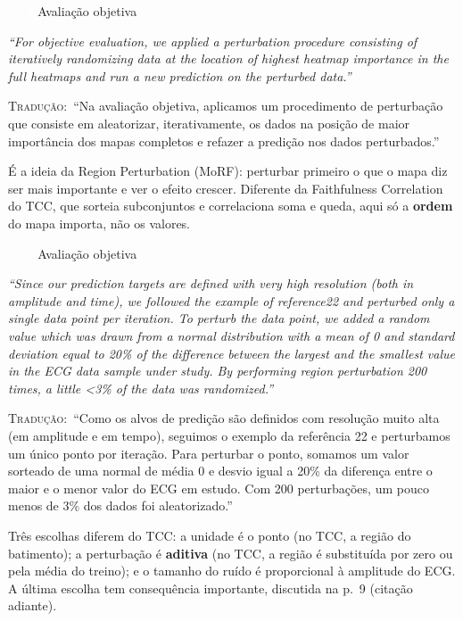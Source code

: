 \documentclass[11pt,a4paper]{article}
\newcommand{\pagechip}[1]{{\setlength{\fboxsep}{1.5pt}\colorbox{cAcc}{\textcolor{white}{\scriptsize\texttt{#1}}}}}
\newenvironment{origquote}{\par\itshape\small}{\par}
\newenvironment{tradquote}{\par\small\textsc{Tradução:}\ }{\par}
\newcommand{\explab}[1]{\par\smallskip{\small\color{cAcc}\textbf{\MakeUppercase{#1}}}\par}
\begin{document}
\begin{citacard}{\pagechip{p. 3} Avaliação objetiva}
\begin{origquote}“For objective evaluation, we applied a perturbation procedure consisting of iteratively randomizing data at the location of highest heatmap importance in the full heatmaps and run a new prediction on the perturbed data.”\end{origquote}
\begin{tradquote}“Na avaliação objetiva, aplicamos um procedimento de perturbação que consiste em aleatorizar, iterativamente, os dados na posição de maior importância dos mapas completos e refazer a predição nos dados perturbados.”\end{tradquote}
\explab{Explicação}
É a ideia da Region Perturbation (MoRF): perturbar primeiro o que o mapa diz ser mais importante e ver o efeito crescer. Diferente da Faithfulness Correlation do TCC, que sorteia subconjuntos e correlaciona soma e queda, aqui só a \textbf{ordem} do mapa importa, não os valores.
\end{citacard}

\begin{citacard}{\pagechip{p. 3} Avaliação objetiva}
\begin{origquote}“Since our prediction targets are defined with very high resolution (both in amplitude and time), we followed the example of reference22 and perturbed only a single data point per iteration. To perturb the data point, we added a random value which was drawn from a normal distribution with a mean of 0 and standard deviation equal to 20\% of the difference between the largest and the smallest value in the ECG data sample under study. By performing region perturbation 200 times, a little <3\% of the data was randomized.”\end{origquote}
\begin{tradquote}“Como os alvos de predição são definidos com resolução muito alta (em amplitude e em tempo), seguimos o exemplo da referência 22 e perturbamos um único ponto por iteração. Para perturbar o ponto, somamos um valor sorteado de uma normal de média 0 e desvio igual a 20\% da diferença entre o maior e o menor valor do ECG em estudo. Com 200 perturbações, um pouco menos de 3\% dos dados foi aleatorizado.”\end{tradquote}
\explab{Explicação}
Três escolhas diferem do TCC: a unidade é o ponto (no TCC, a região do batimento); a perturbação é \textbf{aditiva} (no TCC, a região é substituída por zero ou pela média do treino); e o tamanho do ruído é proporcional à amplitude do ECG. A última escolha tem consequência importante, discutida na p.~9 (citação adiante).
\end{citacard}
\end{document}
